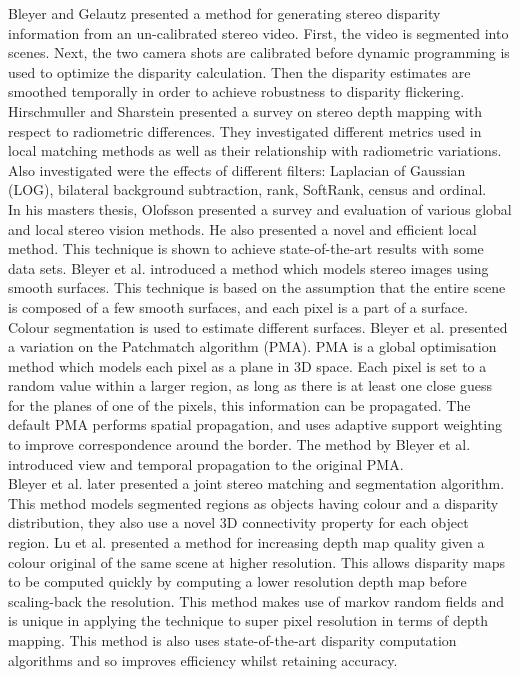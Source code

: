Bleyer and Gelautz \cite{Bleyer09Temporally} presented a method for generating stereo disparity information from an un-calibrated stereo video. First, the video is segmented into scenes. Next, the two camera shots are calibrated before dynamic programming is used to optimize the disparity calculation. Then the disparity estimates are smoothed temporally in order to achieve robustness to disparity flickering. Hirschmuller and Sharstein \cite{Hirschmuller09Evaluation} presented a survey on stereo depth mapping with respect to radiometric differences. They investigated different metrics used in local matching methods as well as their relationship with radiometric variations. Also investigated were the effects of different filters: Laplacian of Gaussian (LOG), bilateral background subtraction, rank, SoftRank, census and ordinal. \\


In his masters thesis, Olofsson \cite{Olofsson10Modern} presented a survey and evaluation of various global and local stereo vision methods. He also presented a novel and efficient local method. This technique is shown to achieve state-of-the-art results with some data sets. Bleyer et al. \cite{Bleyer10Surface} introduced a method which models stereo images using smooth surfaces. This technique is based on the assumption that the entire scene is composed of a few smooth surfaces, and each pixel is a part of a surface. Colour segmentation is used to estimate different surfaces. Bleyer et al. \cite{Bleyer11Patchmatch} presented a variation on the Patchmatch algorithm (PMA). PMA is a global optimisation method which models each pixel as a plane in 3D space. Each pixel is set to a random value within a larger region, as long as there is at least one close guess for the planes of one of the pixels, this information can be propagated. The default PMA performs spatial propagation, and uses adaptive support weighting to improve correspondence around the border. The method by Bleyer et al. introduced view and temporal propagation to the original PMA. \\


Bleyer et al. \cite{Bleyer11Object} later presented a joint stereo matching and segmentation algorithm. This method models segmented regions as objects having colour and a disparity distribution, they also use a novel 3D connectivity property for each object region. Lu et al. \cite{Lu11Revisit} presented a method for increasing depth map quality given a colour original of the same scene at higher resolution. This allows disparity maps to be computed quickly by computing a lower resolution depth map before scaling-back the resolution. This method makes use of markov random fields and is unique in applying the technique to super pixel resolution in terms of depth mapping. This method is also uses state-of-the-art disparity computation algorithms and so improves efficiency whilst retaining accuracy. \\ 


